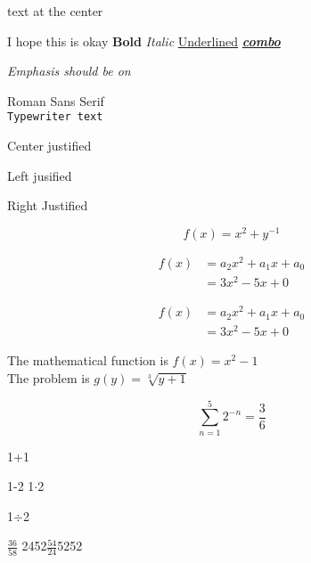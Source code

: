 \documentclass[10pt]{article}
\begin{document}
	\begin{center}
		{\Huge text at the center}
	\end{center}

	I hope this is okay
	\textbf{Bold}
	\textit{Italic}
	\underline{Underlined}
	\textbf{\textit{\underline{combo}}}
	
	
	\emph{Emphasis should be on}
	
	
	\textrm{Roman}
	\textsf{Sans Serif} \\
	\texttt{Typewriter text}
	
	\begin{center}
		Center justified
	\end{center}
	\begin{flushleft}
		Left jusified
	\end{flushleft}
	\begin{flushright}
		Right Justified
	\end{flushright}

	
	
	
	\[ f(x) = x^2+y^{-1}\]
	
	\begin{align*}
		f(x) &= a_2 x^2 + a_1 x +a_0 \\
			&= 3 x^2 -5 x + 0 
	\end{align*}

	\begin{align}
		f(x) &= a_2 x^2 + a_1 x +a_0 
		\nonumber \\
		&= 3 x^2 -5 x + 0 
	\end{align}

	The mathematical function is 
	\(f(x)= x^2 -1\) \\
	The problem is
	$g(y)= \sqrt[3]{y+1}$
	
	\[ 
		\sum_{n=1}^{5} 2^{-n} = \frac{3}{6}
	\]
	
	
	
	1+1 
	
	1-2
	1$\cdot$2 
	
	1$\div$2 
	
	$\frac{36}{58}$
	2452$\tfrac{54}{24}$5252 \\
	
\end{document}
